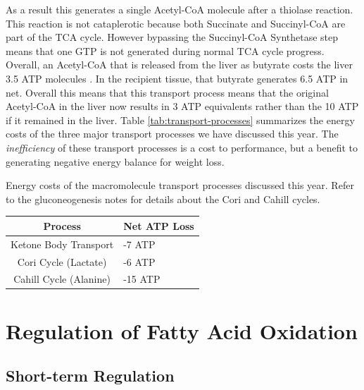 \documentclass{tufte-handout}
\begin{document}
As a result this generates a single Acetyl-CoA molecule after a thiolase reaction.  This reaction is not cataplerotic because both Succinate and Succinyl-CoA are part of the TCA cycle.  However bypassing the Succinyl-CoA Synthetase step means that one GTP is not generated during normal TCA cycle progress.  Overall, an Acetyl-CoA that is released from the liver as butyrate costs the liver 3.5 ATP molecules .  In the recipient tissue, that butyrate generates 6.5 ATP in net.  Overall this means that this transport process means that the original Acetyl-CoA in the liver now results in 3 ATP equivalents rather than the 10 ATP if it remained in the liver.  Table \ref{tab:transport-processes} summarizes the energy costs of the three major transport processes we have discussed this year.  The \emph{inefficiency} of these transport processes is a cost to performance, but a benefit to generating negative energy balance for weight loss.

\begin{margintable}
\centering
\caption{Energy costs of the macromolecule transport processes discussed this year.  Refer to the gluconeogenesis notes for details about the Cori and Cahill cycles.}
\label{tab:transport-processes}
\begin{tabular}{@{}cl@{}}
\toprule
\textbf{Process} & \textbf{Net ATP Loss} \\ \midrule
Ketone Body Transport  &  -7 ATP  \\
Cori Cycle (Lactate)    & -6 ATP  \\
Cahill Cycle (Alanine)       & -15 ATP \\ \bottomrule
\end{tabular}
\end{margintable}

\section{Regulation of Fatty Acid Oxidation}

\subsection{Short-term Regulation}
\end{document}
